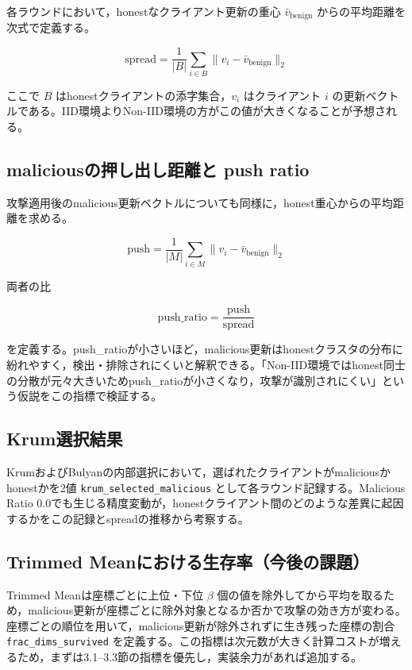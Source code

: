 \documentclass[a4j, twocolumn, dvipdfmx]{jsarticle}
\begin{document}
各ラウンドにおいて，honestなクライアント更新の重心 $\bar{v}_{\text{benign}}$ からの平均距離を次式で定義する。

\begin{equation}
\text{spread} = \frac{1}{|B|}\sum_{i \in B} \|v_i - \bar{v}_{\text{benign}}\|_2
\end{equation}

ここで $B$ はhonestクライアントの添字集合，$v_i$ はクライアント $i$ の更新ベクトルである。IID環境よりNon-IID環境の方がこの値が大きくなることが予想される。

\subsection{maliciousの押し出し距離と push ratio}

攻撃適用後のmalicious更新ベクトルについても同様に，honest重心からの平均距離を求める。

\begin{equation}
\text{push} = \frac{1}{|M|}\sum_{i \in M} \|v_i - \bar{v}_{\text{benign}}\|_2
\end{equation}

両者の比

\begin{equation}
\text{push\_ratio} = \frac{\text{push}}{\text{spread}}
\end{equation}

を定義する。push\_ratioが小さいほど，malicious更新はhonestクラスタの分布に紛れやすく，検出・排除されにくいと解釈できる。「Non-IID環境ではhonest同士の分散が元々大きいためpush\_ratioが小さくなり，攻撃が識別されにくい」という仮説をこの指標で検証する。

\subsection{Krum選択結果}

KrumおよびBulyanの内部選択において，選ばれたクライアントがmaliciousかhonestかを2値 \texttt{krum\_selected\_malicious} として各ラウンド記録する。Malicious Ratio 0.0でも生じる精度変動が，honestクライアント間のどのような差異に起因するかをこの記録とspreadの推移から考察する。

\subsection{Trimmed Meanにおける生存率（今後の課題）}

Trimmed Meanは座標ごとに上位・下位 $\beta$ 個の値を除外してから平均を取るため，malicious更新が座標ごとに除外対象となるか否かで攻撃の効き方が変わる。座標ごとの順位を用いて，malicious更新が除外されずに生き残った座標の割合 \texttt{frac\_dims\_survived} を定義する。この指標は次元数が大きく計算コストが増えるため，まずは3.1--3.3節の指標を優先し，実装余力があれば追加する。
\end{document}
